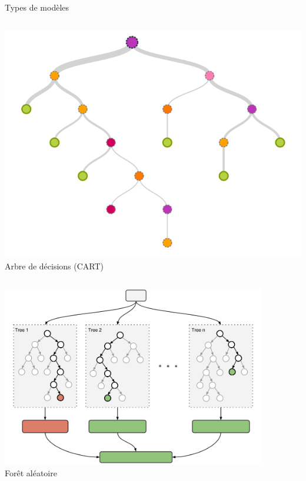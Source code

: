 \documentclass[compress]{beamer}
\begin{document}
\begin{frame}{Types de modèles}
\begin{adjustwidth}{-2.5em}{-2.5em}
\begin{columns}
    \begin{column}{0.33\textwidth}
      \centering
      \includegraphics[width=\textwidth]{resources/CART}\\
      {\footnotesize Arbre de décisions (CART)}
    \end{column}
  \end{columns}
  \vspace{0.5cm}
  \begin{columns}
   \begin{column}{0.33\textwidth}
     \centering
     \includegraphics[width=0.9\textwidth]{resources/random_forest}\\
     {\footnotesize Forêt aléatoire}
   \end{column}
   \begin{column}{0.33\textwidth}
     \centering

\end{column}
\end{columns}
\end{adjustwidth}
\end{frame}
\end{document}
